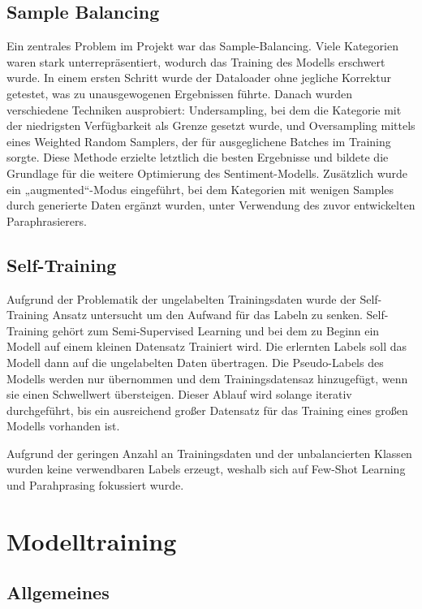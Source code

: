 \subsection{Sample Balancing}

Ein zentrales Problem im Projekt war das Sample-Balancing. Viele Kategorien waren stark
unterrepräsentiert, wodurch das Training des Modells erschwert wurde. In einem ersten Schritt wurde
der Dataloader ohne jegliche Korrektur getestet, was zu unausgewogenen Ergebnissen führte. Danach
wurden verschiedene Techniken ausprobiert: Undersampling, bei dem die Kategorie mit der niedrigsten
Verfügbarkeit als Grenze gesetzt wurde, und Oversampling mittels eines Weighted Random Samplers, der
für ausgeglichene Batches im Training sorgte. Diese Methode erzielte letztlich die besten Ergebnisse
und bildete die Grundlage für die weitere Optimierung des Sentiment-Modells. Zusätzlich wurde ein
„augmented“-Modus eingeführt, bei dem Kategorien mit wenigen Samples durch generierte Daten ergänzt
wurden, unter Verwendung des zuvor entwickelten Paraphrasierers.

\subsection{Self-Training}

Aufgrund der Problematik der ungelabelten Trainingsdaten wurde der Self-Training Ansatz
untersucht um den Aufwand für das Labeln zu senken. Self-Training gehört zum Semi-Supervised
Learning und bei dem zu Beginn ein Modell auf einem kleinen Datensatz Trainiert wird. Die
erlernten Labels soll das Modell dann auf die ungelabelten Daten übertragen. Die Pseudo-Labels
des Modells werden nur übernommen und dem Trainingsdatensaz hinzugefügt, wenn sie einen
Schwellwert übersteigen. Dieser Ablauf wird solange iterativ durchgeführt, bis ein ausreichend
großer Datensatz für das Training eines großen Modells vorhanden ist.  

Aufgrund der geringen Anzahl an Trainingsdaten und der unbalancierten Klassen wurden keine 
verwendbaren Labels erzeugt, weshalb sich auf Few-Shot Learning und Parahprasing fokussiert wurde. 

\newpage
\section{Modelltraining}

\subsection{Allgemeines}

